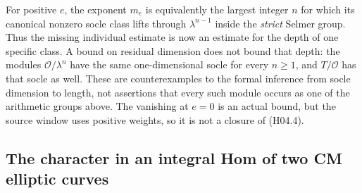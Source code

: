 \begin{remark}
For positive $e$, the exponent $m_e$ is equivalently the
largest integer $n$ for which its canonical nonzero socle class lifts
through $\lambda^{n-1}$ inside the \emph{strict} Selmer group.
Thus the missing individual estimate is now an estimate for the
depth of one specific class.  A bound on residual dimension does not
bound that depth: the modules $\mathcal O/\lambda^n$ have the same
one-dimensional socle for every $n\geq1$, and $T/\mathcal O$ has that
socle as well.  These are counterexamples to the formal inference
from socle dimension to length, not assertions that every such
module occurs as one of the arithmetic groups above.
The vanishing at $e=0$ is an actual bound, but the source window
uses positive weights, so it is not a closure of (H04.4).
\end{remark}

\subsection{The character in an integral Hom of two CM elliptic curves}

